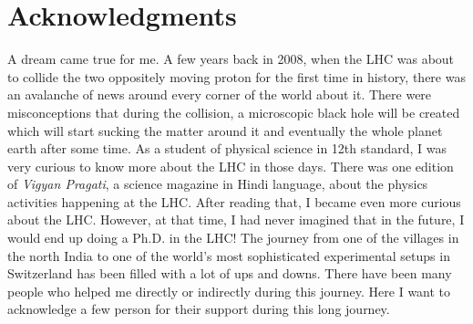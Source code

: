 \chapter{Acknowledgments}

\lettrine[lines=2, findent=3pt, nindent=0pt]{A}{} dream came true for me. A few 
years back in 2008, when the LHC was about to collide the two oppositely
moving proton for the first time in history, there was an avalanche of news
around every corner of the world about it. There were misconceptions that
during the collision, a microscopic black hole will be created which will start 
sucking the matter around it and eventually the whole planet earth after some time.
As a student of physical science in 12th standard, I was very curious to know 
more about the LHC in those days. There was one edition of \textit{Vigyan Pragati},
a science magazine in Hindi language, about the physics activities happening at the
LHC. After reading that, I became even more curious about the LHC. However, at 
that time, I had never imagined that in the future, I would end up doing a Ph.D. 
in the LHC! The journey from one of the villages in the north India to one of the world's most 
sophisticated experimental setups in Switzerland has been filled with a 
lot of ups and downs. There have been many people who helped me directly or 
indirectly during this journey. Here I want to acknowledge a few person for their support during this long journey.

